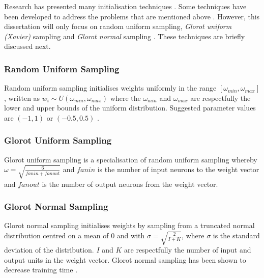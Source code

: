Research has presented many initialisation techniques \cite{ref:erdogmus:2003}.
Some techniques have been developed to address the problems that are mentioned
above \cite{ref:yadav:2018}. However, this dissertation will only focus on
random uniform sampling, \textit{Glorot uniform (Xavier)} sampling and \textit{Glorot normal} sampling \cite{ref:glorot:2010}. These
techniques are briefly discussed next.


\subsubsection{Random Uniform Sampling}
\label{sec:anns:an:weights:random_uniform_sampling}

Random uniform sampling initialises weights
uniformly in the range $[\omega_{min}, \omega_{max}]$, written as $w_{i} \sim
\textit{U} (\omega_{min}, \omega_{max})$ where the $\omega_{min}$ and
$\omega_{max}$ are respectfully the lower and upper bounds of the uniform
distribution. Suggested parameter values are $(-1, 1)$ or $(-0.5, 0.5)$
\cite{ref:nguyen:1990}.


\subsubsection{Glorot Uniform Sampling}
\label{sec:anns:an:weights:glorot_uniform_sampling}

Glorot uniform sampling is a specialisation of
random uniform sampling whereby $\omega =
\sqrt{\frac{6}{fanin + fanout}}$ and $fanin$ is the number of
input neurons to the weight vector and $fanout$ is the number of
output neurons from the weight vector.

\subsubsection{Glorot Normal Sampling}
\label{sec:anns:an:weights:glorot_normal_sampling}

Glorot normal sampling initialises weights by
sampling from a truncated normal distribution centred on a mean of $0$ and with
$\sigma = \sqrt{\frac{2}{I + K}}$, where $\sigma$ is the standard deviation of
the distribution. $I$ and $K$ are respectfully the number of input and output
units in the weight vector. Glorot normal sampling
has been shown to decrease training time \cite{ref:glorot:2010}.  


